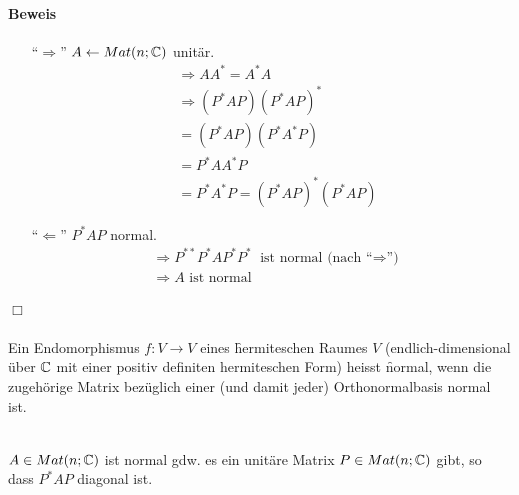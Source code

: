 \paragraph{Beweis}
\begin{itemize}
\item[``$\Rightarrow$''] $A \leftarrow Mat(n; \mathbb{C})$ unitär.
\begin{align}
&\Rightarrow AA^{*} = A^{*} A \\
&\Rightarrow (P^{*} A P) (P^{*} A P)^{*} \\
&= (P^{*} A P) (P^{*} A^{*} P) \\
&= P^{*} A A^{*} P\\
&= P^{*} A^{*} P = (P^{*} A P)^{*} (P^{*} A P)
\end{align}

\item[``$\Leftarrow$''] $P^{*} A P$ normal.
\begin{align}
&\Rightarrow P^{**} P^{*} A P^{*} P^{*} \text{ ist normal (nach ``$\Rightarrow$'')} \\
&\Rightarrow A \text{ ist normal}
\end{align}
\end{itemize}
\hfill $\Box$ \\\\
Ein Endomorphismus $f: V \rightarrow V$ eines \f{hermiteschen Raumes} $V$ (endlich-dimensional über $\mathbb{C}$ mit einer positiv definiten hermiteschen Form) heisst \f{normal}, wenn die zugehörige Matrix bezüglich einer (und damit jeder) Orthonormalbasis normal ist. \\\\

\begin{satz} %
\label{satz572} %
$A \in Mat(n; \mathbb{C})$ ist normal gdw. es ein unitäre Matrix $P \in Mat(n; \mathbb{C})$ gibt, so dass $P^{*} A P$ diagonal ist.
\end{satz}

